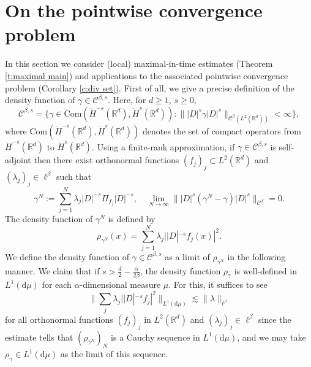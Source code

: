 \documentclass[a4paper]{amsart}
\numberwithin{equation}{section}%
\theoremstyle{plain}%
\theoremstyle{definition}
\theoremstyle{remark}%
\def\d{\mathrm{d}}
\def\C{\mathcal{C}}
\def\C{\mathcal{C}}
\newcommand{\R}{{\mathbb R}}
\begin{document}
\section{On the pointwise convergence problem}\label{s:PW}
In this section we consider (local) maximal-in-time estimates (Theorem \ref{t:maximal main}) and applications to the associated pointwise convergence problem (Corollary \ref{c:div set}). 
First of all, we give a precise definition of the density function of $\gamma \in \mathcal{C}^{\beta,s}$. 
Here, for $d\geq 1$, $s \geq 0$, 
\[
\mathcal{C}^{\beta,s} =
\{
\gamma \in \mathrm{Com}(\dot{H}^{-s} (\R^d), \dot{H}^{s} (\R^d)) : \| |D|^s \gamma |D|^s \|_{\C^{\beta}(L^2(\R^d))}<\infty
\},
\]
where $\mathrm{Com}(\dot{H}^{-s} (\R^d), \dot{H}^{s} (\R^d))$ denotes the set of compact operators from $\dot{H}^{-s}(\R^{d})$ to $\dot{H}^{s}(\R^{d})$. Using a finite-rank approximation, if $\gamma \in \mathcal{C}^{\beta,s}$ is self-adjoint then there exist orthonormal functions $(f_j )_j \subset L^2(\R^d)$ and $(\lambda_j)_j \in \ell^{\beta}$ such that
\[
\gamma^N := \sum_{j=1}^N \lambda_j |D|^{-s} \Pi_{f_j} |D|^{-s}, \quad \lim_{N \to \infty} \||D|^s(\gamma^N - \gamma)|D|^s \|_{\C^{\beta}}=0. 
\]
The density function of $\gamma^N$ is defined by
\[
\rho_{\gamma^N}(x) = \sum_{j=1}^N \lambda_j | |D|^{-s} f_j (x)|^2.
\]
We define the density function of $\gamma \in \mathcal{C}^{\beta,s}$ as a limit of $\rho_{\gamma^N}$ in the following manner. We claim that if $s > \frac{d}{2} - \frac{\alpha}{2 \beta}$, the density function $\rho_{\gamma}$ is well-defined in $L^1(\d \mu)$ for each $\alpha$-dimensional measure $\mu$. For this, it suffices to see
\begin{equation}
    \label{est:DensityWell-defined}
    \bigg\| \sum_{j} \lambda_j | |D|^{-s} f_j |^2 \bigg\|_{L^1(\d \mu)} \lesssim \|\lambda \|_{\ell^{\beta}}
\end{equation}
for all orthonormal functions $(f_j)_{j}$ in $L^2(\R^d)$ and $(\lambda_j)_j\in\ell^\beta$ since the estimate tells that $(\rho_{\gamma^N})_N$ is a Cauchy sequence in $L^1(\d \mu)$, and we may take $\rho_{\gamma} \in L^1(\d \mu)$ as the limit of this sequence. 
\end{document}
